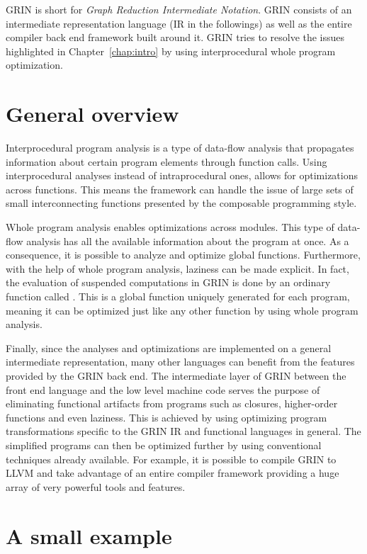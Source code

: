 \documentclass[main.tex]{subfiles}
\begin{document}
	
	GRIN is short for \emph{Graph Reduction Intermediate Notation}. GRIN consists of an intermediate representation language (IR in the followings) as well as the entire compiler back end framework built around it. GRIN tries to resolve the issues highlighted in Chapter~\ref{chap:intro} by using interprocedural whole program optimization. 
	
	\section{General overview}
	
	Interprocedural program analysis is a type of data-flow analysis that propagates information about certain program elements through function calls. Using interprocedural analyses instead of intraprocedural ones, allows for optimizations across functions. This means the framework can handle the issue of large sets of small interconnecting functions presented by the composable programming style. 
	
	Whole program analysis enables optimizations across modules. This type of data-flow analysis has all the available information about the program at once. As a consequence, it is possible to analyze and optimize global functions. Furthermore, with the help of whole program analysis, laziness can be made explicit. In fact, the evaluation of suspended computations in GRIN is done by an ordinary function called . This is a global function uniquely generated for each program, meaning it can be optimized just like any other function by using whole program analysis. 
	
	Finally, since the analyses and optimizations are implemented on a general intermediate representation, many other languages can benefit from the features provided by the GRIN back end. The intermediate layer of GRIN between the front end language and the low level machine code serves the purpose of eliminating functional artifacts from programs such as closures, higher-order functions and even laziness. This is achieved by using optimizing program transformations specific to the GRIN IR and functional languages in general. The simplified programs can then be optimized further by using conventional techniques already available. For example, it is possible to compile GRIN to LLVM and take advantage of an entire compiler framework providing a huge array of very powerful tools and features.
	
	
	\section{A small example}
	
\end{document}
